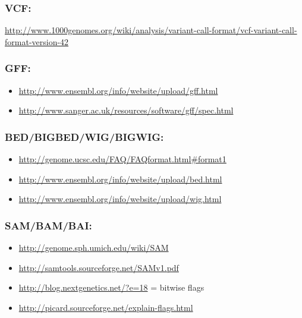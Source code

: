 \documentclass[letterpaper,10pt,english]{sphinxmanual}
\begin{document}
\subsubsection{VCF:}
\label{known_file_formats:vcf}
\href{http://www.1000genomes.org/wiki/analysis/variant-call-format/vcf-variant-call-format-version-42}{http://www.1000genomes.org/wiki/analysis/variant-call-format/vcf-variant-call-format-version-42}


\subsubsection{GFF:}
\label{known_file_formats:gff}\begin{itemize}
\item {} 
\href{http://www.ensembl.org/info/website/upload/gff.html}{http://www.ensembl.org/info/website/upload/gff.html}

\item {} 
\href{http://www.sanger.ac.uk/resources/software/gff/spec.html}{http://www.sanger.ac.uk/resources/software/gff/spec.html}

\end{itemize}


\subsubsection{BED/BIGBED/WIG/BIGWIG:}
\label{known_file_formats:bed-bigbed-wig-bigwig}\begin{itemize}
\item {} 
\href{http://genome.ucsc.edu/FAQ/FAQformat.html\#format1}{http://genome.ucsc.edu/FAQ/FAQformat.html\#format1}

\item {} 
\href{http://www.ensembl.org/info/website/upload/bed.html}{http://www.ensembl.org/info/website/upload/bed.html}

\item {} 
\href{http://www.ensembl.org/info/website/upload/wig.html}{http://www.ensembl.org/info/website/upload/wig.html}

\end{itemize}


\subsubsection{SAM/BAM/BAI:}
\label{known_file_formats:sam-bam-bai}\begin{itemize}
\item {} 
\href{http://genome.sph.umich.edu/wiki/SAM}{http://genome.sph.umich.edu/wiki/SAM}

\item {} 
\href{http://samtools.sourceforge.net/SAMv1.pdf}{http://samtools.sourceforge.net/SAMv1.pdf}

\item {} 
\href{http://blog.nextgenetics.net/?e=18}{http://blog.nextgenetics.net/?e=18} = bitwise flags

\item {} 
\href{http://picard.sourceforge.net/explain-flags.html}{http://picard.sourceforge.net/explain-flags.html}

\end{itemize}
\end{document}
